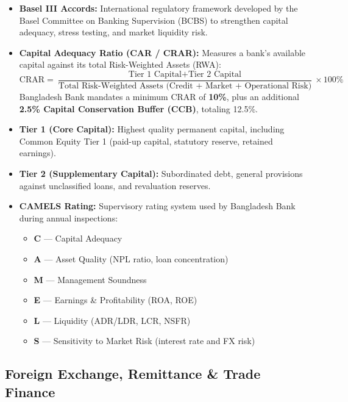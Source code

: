 \begin{itemize}
  \item \textbf{Basel III Accords:} International regulatory framework developed by the Basel Committee on Banking Supervision (BCBS) to strengthen capital adequacy, stress testing, and market liquidity risk.
  \item \textbf{Capital Adequacy Ratio (CAR / CRAR):} Measures a bank's available capital against its total Risk-Weighted Assets (RWA):
  \[
  \text{CRAR} = \frac{\text{Tier 1 Capital} + \text{Tier 2 Capital}}{\text{Total Risk-Weighted Assets (Credit + Market + Operational Risk)}} \times 100\%
  \]
  Bangladesh Bank mandates a minimum CRAR of \textbf{10\%}, plus an additional \textbf{2.5\% Capital Conservation Buffer (CCB)}, totaling 12.5\%.
  \item \textbf{Tier 1 (Core Capital):} Highest quality permanent capital, including Common Equity Tier 1 (paid-up capital, statutory reserve, retained earnings).
  \item \textbf{Tier 2 (Supplementary Capital):} Subordinated debt, general provisions against unclassified loans, and revaluation reserves.
  \item \textbf{CAMELS Rating:} Supervisory rating system used by Bangladesh Bank during annual inspections:
  \begin{itemize}
    \item \textbf{C} --- Capital Adequacy
    \item \textbf{A} --- Asset Quality (NPL ratio, loan concentration)
    \item \textbf{M} --- Management Soundness
    \item \textbf{E} --- Earnings \& Profitability (ROA, ROE)
    \item \textbf{L} --- Liquidity (ADR/LDR, LCR, NSFR)
    \item \textbf{S} --- Sensitivity to Market Risk (interest rate and FX risk)
  \end{itemize}
\end{itemize}

\medskip

\subsection{Foreign Exchange, Remittance \& Trade Finance}


